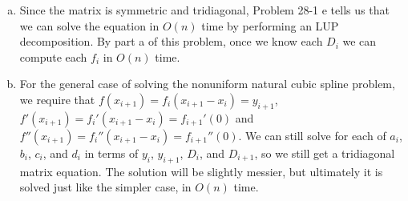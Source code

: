 \documentclass{article}
\begin{document}
\begin{enumerate}[a.]
\item Since the matrix is symmetric and tridiagonal, Problem 28-1 e tells us that we can solve the equation in $O(n)$ time by performing an LUP decomposition.  By part a of this problem, once we know each $D_i$ we can compute each $f_i$ in $O(n)$ time. 

\item For the general case of solving the nonuniform natural cubic spline problem, we require that $f(x_{i+1}) = f_i(x_{i+1} - x_i) = y_{i+1}$, $f'(x_{i+1}) = f_i'(x_{i+1}-x_i) = f_{i+1}'(0)$ and $f''(x_{i+1}) = f_i''(x_{i+1} - x_i) = f_{i+1}''(0)$. We can still solve for each of $a_i$, $b_i$, $c_i$, and $d_i$ in terms of $y_i$, $y_{i+1}$, $D_i$, and $D_{i+1}$, so we still get a tridiagonal matrix equation.  The solution will be slightly messier, but ultimately it is solved just like the simpler case, in $O(n)$ time. 
\end{enumerate}
\end{document}

